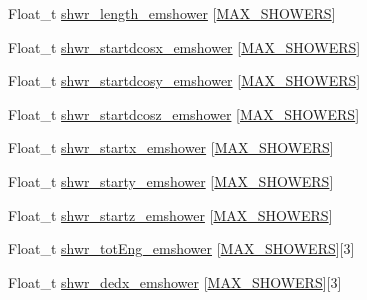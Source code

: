 \begin{DoxyCompactItemize}
\item 
Float\-\_\-t \hyperlink{classanatree_a6cb463353d2afb0949886483b33f8549}{shwr\-\_\-length\-\_\-emshower} \mbox{[}\hyperlink{anatree__core__v09410002__orig_8h_aa8deaf72f1f7bd4b88c7d1ea07590801}{M\-A\-X\-\_\-\-S\-H\-O\-W\-E\-R\-S}\mbox{]}
\item 
Float\-\_\-t \hyperlink{classanatree_a5df50459b3dc4260963b5231427968c4}{shwr\-\_\-startdcosx\-\_\-emshower} \mbox{[}\hyperlink{anatree__core__v09410002__orig_8h_aa8deaf72f1f7bd4b88c7d1ea07590801}{M\-A\-X\-\_\-\-S\-H\-O\-W\-E\-R\-S}\mbox{]}
\item 
Float\-\_\-t \hyperlink{classanatree_a5ecdd272fc336ed529dcc53acc471f49}{shwr\-\_\-startdcosy\-\_\-emshower} \mbox{[}\hyperlink{anatree__core__v09410002__orig_8h_aa8deaf72f1f7bd4b88c7d1ea07590801}{M\-A\-X\-\_\-\-S\-H\-O\-W\-E\-R\-S}\mbox{]}
\item 
Float\-\_\-t \hyperlink{classanatree_a700d6e7e8277518dcb7d497574c308ab}{shwr\-\_\-startdcosz\-\_\-emshower} \mbox{[}\hyperlink{anatree__core__v09410002__orig_8h_aa8deaf72f1f7bd4b88c7d1ea07590801}{M\-A\-X\-\_\-\-S\-H\-O\-W\-E\-R\-S}\mbox{]}
\item 
Float\-\_\-t \hyperlink{classanatree_a4cc58d005e47a1ca0abd2ef9fd226462}{shwr\-\_\-startx\-\_\-emshower} \mbox{[}\hyperlink{anatree__core__v09410002__orig_8h_aa8deaf72f1f7bd4b88c7d1ea07590801}{M\-A\-X\-\_\-\-S\-H\-O\-W\-E\-R\-S}\mbox{]}
\item 
Float\-\_\-t \hyperlink{classanatree_ac370306b31632d3a3790081998d86dae}{shwr\-\_\-starty\-\_\-emshower} \mbox{[}\hyperlink{anatree__core__v09410002__orig_8h_aa8deaf72f1f7bd4b88c7d1ea07590801}{M\-A\-X\-\_\-\-S\-H\-O\-W\-E\-R\-S}\mbox{]}
\item 
Float\-\_\-t \hyperlink{classanatree_a0f1f0fe9cceeb189a3366ca4afbb6f9f}{shwr\-\_\-startz\-\_\-emshower} \mbox{[}\hyperlink{anatree__core__v09410002__orig_8h_aa8deaf72f1f7bd4b88c7d1ea07590801}{M\-A\-X\-\_\-\-S\-H\-O\-W\-E\-R\-S}\mbox{]}
\item 
Float\-\_\-t \hyperlink{classanatree_a284ba0af819815e92479c6c97377924b}{shwr\-\_\-tot\-Eng\-\_\-emshower} \mbox{[}\hyperlink{anatree__core__v09410002__orig_8h_aa8deaf72f1f7bd4b88c7d1ea07590801}{M\-A\-X\-\_\-\-S\-H\-O\-W\-E\-R\-S}\mbox{]}\mbox{[}3\mbox{]}
\item 
Float\-\_\-t \hyperlink{classanatree_a5a2edbdec9937f0591074ec227fdc7a3}{shwr\-\_\-dedx\-\_\-emshower} \mbox{[}\hyperlink{anatree__core__v09410002__orig_8h_aa8deaf72f1f7bd4b88c7d1ea07590801}{M\-A\-X\-\_\-\-S\-H\-O\-W\-E\-R\-S}\mbox{]}\mbox{[}3\mbox{]}
\item 

\end{DoxyCompactItemize}
